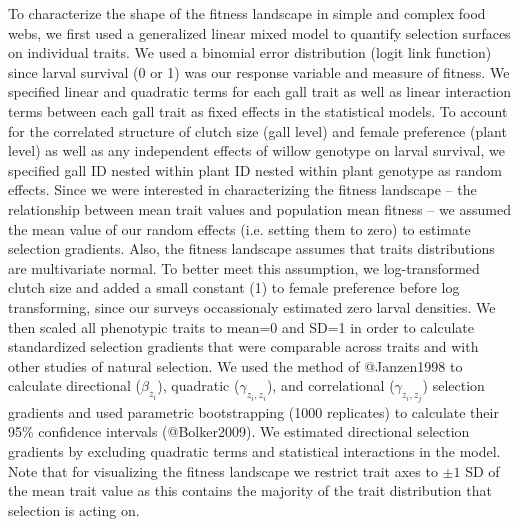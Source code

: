 \documentclass[11pt]{article}
\begin{document}
To characterize the shape of the fitness landscape in simple and complex food webs, we first used a generalized linear mixed model to quantify selection surfaces on individual traits. We used a binomial error distribution (logit link function) since larval survival (0 or 1) was our response variable and measure of fitness. We specified linear and quadratic terms for each gall trait as well as linear interaction terms between each gall trait as fixed effects in the statistical models. To account for the correlated structure of clutch size (gall level) and female preference (plant level) as well as any independent effects of willow genotype on larval survival, we specified gall ID nested within plant ID nested within plant genotype as random effects. Since we were interested in characterizing the fitness landscape -- the relationship between mean trait values and population mean fitness -- we assumed the mean value of our random effects (i.e. setting them to zero) to estimate selection gradients. Also, the fitness landscape assumes that traits distributions are multivariate normal. To better meet this assumption, we log-transformed clutch size and added a small constant (1) to female preference before log transforming, since our surveys occassionaly estimated zero larval densities. We then scaled all phenotypic traits to mean=0 and SD=1 in order to calculate standardized selection gradients that were comparable across traits and with other studies of natural selection. We used the method of @Janzen1998 to calculate directional ($\beta_{z_i}$), quadratic ($\gamma_{z_i,z_i}$), and correlational ($\gamma_{z_i,z_j}$) selection gradients and used parametric bootstrapping (1000 replicates) to calculate their 95\% confidence intervals (@Bolker2009). We estimated directional selection gradients by excluding quadratic terms and statistical interactions in the model. Note that for visualizing the fitness landscape we restrict trait axes to $\pm 1$ SD of the mean trait value as this contains the majority of the trait distribution that selection is acting on.
\end{document}
